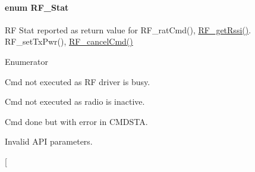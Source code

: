 \paragraph[{R\+F\+\_\+\+Stat}]{\setlength{\rightskip}{0pt plus 5cm}enum {\bf R\+F\+\_\+\+Stat}}\label{_r_f_8h_afdc219ddabc8427ecd552a6c78d9988f}


R\+F Stat reported as return value for R\+F\+\_\+rat\+Cmd(), \hyperlink{_r_f_8h_ac3fe0d39243fb6bbefe0216d958a6779}{R\+F\+\_\+get\+Rssi()}. R\+F\+\_\+set\+Tx\+Pwr(), \hyperlink{_r_f_8h_aabe22ceae13a372be4ba135318aa849a}{R\+F\+\_\+cancel\+Cmd()} 

\begin{Desc}
\item[Enumerator]\par
\begin{description}
\item[{\em 
R\+F\+\_\+\+Stat\+Busy\+Error\label{_r_f_8h_afdc219ddabc8427ecd552a6c78d9988faa79a13241903199d3bc25c8f06407de9}
}]Cmd not executed as R\+F driver is busy. \item[{\em 
R\+F\+\_\+\+Stat\+Radio\+Inactive\+Error\label{_r_f_8h_afdc219ddabc8427ecd552a6c78d9988fa80848b887667038bbfa4a2d14e83b193}
}]Cmd not executed as radio is inactive. \item[{\em 
R\+F\+\_\+\+Stat\+Cmd\+Done\+Error\label{_r_f_8h_afdc219ddabc8427ecd552a6c78d9988fa612e247f325ff085321b8e243f6b1d3d}
}]Cmd done but with error in C\+M\+D\+S\+T\+A. \item[{\em 
R\+F\+\_\+\+Stat\+Invalid\+Params\+Error\label{_r_f_8h_afdc219ddabc8427ecd552a6c78d9988face124dc75bad005452467d6f29351301}
}]Invalid A\+P\+I parameters. \item[{\em 
}
\end{description}
\end{Desc}
